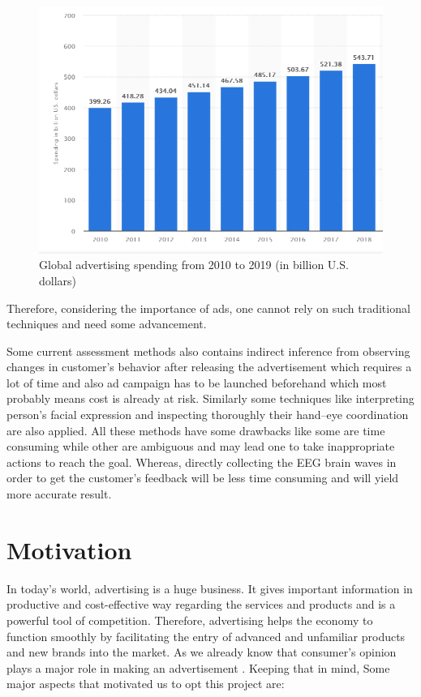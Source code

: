 \documentclass[a4paper, 12pt, oneside]{uet_thesis}
\begin{document}
\begin{figure}[htbp]
\centerline{\includegraphics[scale=0.6]{Figure1.png}}
\caption{Global advertising spending from 2010 to 2019 (in billion U.S. dollars)}
\label{Figure 1}
\end{figure}
Therefore, considering the importance of ads, one cannot rely on such traditional techniques and need some advancement.\par
Some current assessment methods also contains indirect inference from observing changes in customer’s behavior after releasing the advertisement which requires a lot of time and also ad campaign has to be launched beforehand which most probably means cost is already at risk. Similarly some techniques like interpreting person's facial expression and inspecting thoroughly their hand–eye coordination are also applied. All these methods have some drawbacks like some are time consuming while other are ambiguous and may lead one to take inappropriate actions to reach the goal. Whereas, directly collecting the EEG brain waves in order to get the customer’s feedback will be less time consuming and will yield more accurate result.

\section{Motivation}
In today’s world, advertising is a huge business. It gives important information in productive and cost-effective way regarding the services and products and is a powerful tool of competition. Therefore, advertising helps the economy to function smoothly by facilitating the entry of advanced and unfamiliar products and new brands into the market. As we already know that consumer’s opinion plays a major role in making an advertisement . Keeping that in mind, Some major aspects that motivated us to opt this project are:
\end{document}
